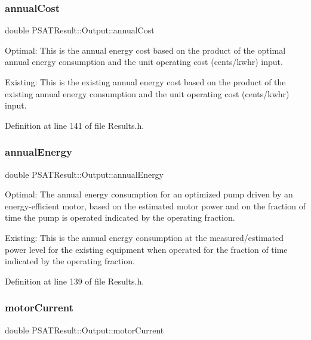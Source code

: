 \subsubsection{\texorpdfstring{annual\+Cost}{annualCost}}
{\footnotesize\ttfamily double P\+S\+A\+T\+Result\+::\+Output\+::annual\+Cost}



Optimal\+: This is the annual energy cost based on the product of the optimal annual energy consumption and the unit operating cost (cents/kwhr) input. 

Existing\+: This is the existing annual energy cost based on the product of the existing annual energy consumption and the unit operating cost (cents/kwhr) input. 

Definition at line 141 of file Results.\+h.

\mbox{\label{struct_p_s_a_t_result_1_1_output_aa5c429ca2975c3222ed79e3847d1bf09}} 
\subsubsection{\texorpdfstring{annual\+Energy}{annualEnergy}}
{\footnotesize\ttfamily double P\+S\+A\+T\+Result\+::\+Output\+::annual\+Energy}



Optimal\+: The annual energy consumption for an optimized pump driven by an energy-\/efficient motor, based on the estimated motor power and on the fraction of time the pump is operated indicated by the operating fraction. 

Existing\+: This is the annual energy consumption at the measured/estimated power level for the existing equipment when operated for the fraction of time indicated by the operating fraction. 

Definition at line 139 of file Results.\+h.

\mbox{\label{struct_p_s_a_t_result_1_1_output_a90611798efa48c24155f6c957683d3a8}} 
\subsubsection{\texorpdfstring{motor\+Current}{motorCurrent}}
{\footnotesize\ttfamily double P\+S\+A\+T\+Result\+::\+Output\+::motor\+Current}



